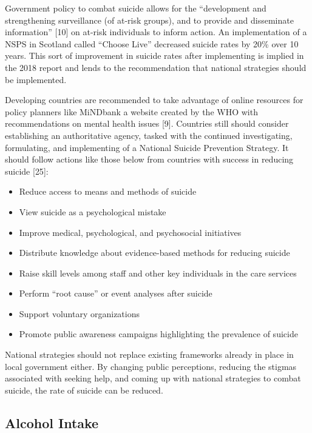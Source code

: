 \documentclass[]{article}
\begin{document}
Government policy to combat suicide allows for the ``development and
strengthening surveillance (of at-risk groups), and to provide and
disseminate information'' {[}10{]} on at-risk individuals to inform
action. An implementation of a NSPS in Scotland called ``Choose Live''
decreased suicide rates by 20\% over 10 years. This sort of improvement
in suicide rates after implementing is implied in the 2018 report and
lends to the recommendation that national strategies should be
implemented.

Developing countries are recommended to take advantage of online
resources for policy planners like MiNDbank a website created by the WHO
with recommendations on mental health issues {[}9{]}. Countries still
should consider establishing an authoritative agency, tasked with the
continued investigating, formulating, and implementing of a National
Suicide Prevention Strategy. It should follow actions like those below
from countries with success in reducing suicide {[}25{]}:

\begin{itemize}
  \item Reduce access to means and methods of suicide 
  \item View suicide as a psychological mistake
  \item Improve medical, psychological, and psychosocial initiatives
  \item Distribute knowledge about evidence-based methods for reducing suicide
  \item Raise skill levels among staff and other key individuals in the care services
  \item Perform “root cause” or event analyses after suicide
  \item Support voluntary organizations 
  \item Promote public awareness campaigns highlighting the prevalence of suicide
\end{itemize}

National strategies should not replace existing frameworks already in
place in local government either. By changing public perceptions,
reducing the stigmas associated with seeking help, and coming up with
national strategies to combat suicide, the rate of suicide can be
reduced.

\subsection{Alcohol Intake}\label{alcohol-intake}
\end{document}
